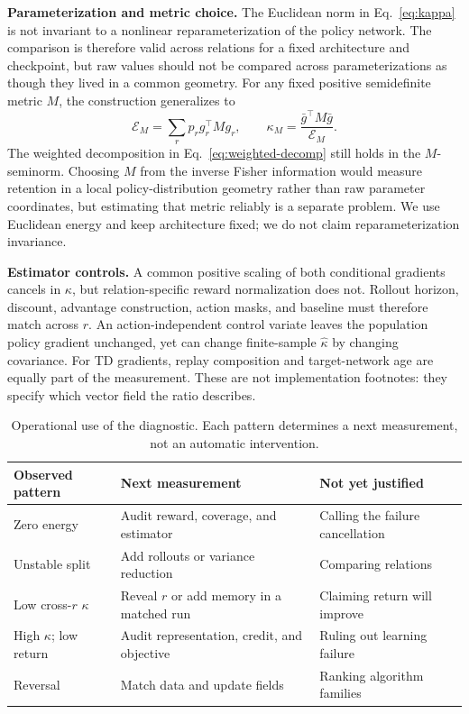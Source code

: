 \documentclass[letterpaper]{article}
\begin{document}
\textbf{Parameterization and metric choice.}
The Euclidean norm in Eq.~\eqref{eq:kappa} is not invariant to a nonlinear reparameterization of the policy network.
The comparison is therefore valid across relations for a fixed architecture and checkpoint, but raw values should not be compared across parameterizations as though they lived in a common geometry.
For any fixed positive semidefinite metric $M$, the construction generalizes to
\begin{equation}
\mathcal{E}_M=\sum_r p_r g_r^\top M g_r,
\qquad
\kappa_M=\frac{\bar g^\top M\bar g}{\mathcal{E}_M}.
\label{eq:metric}
\end{equation}
The weighted decomposition in Eq.~\eqref{eq:weighted-decomp} still holds in the $M$-seminorm.
Choosing $M$ from the inverse Fisher information would measure retention in a local policy-distribution geometry rather than raw parameter coordinates, but estimating that metric reliably is a separate problem.
We use Euclidean energy and keep architecture fixed; we do not claim reparameterization invariance.

\textbf{Estimator controls.}
A common positive scaling of both conditional gradients cancels in $\kappa$, but relation-specific reward normalization does not.
Rollout horizon, discount, advantage construction, action masks, and baseline must therefore match across $r$.
An action-independent control variate leaves the population policy gradient unchanged, yet can change finite-sample $\widehat\kappa$ by changing covariance.
For TD gradients, replay composition and target-network age are equally part of the measurement.
These are not implementation footnotes: they specify which vector field the ratio describes.

\begin{table}[t]
\centering
\small
\setlength{\tabcolsep}{2.5pt}
\begin{tabular}{
>{\raggedright\arraybackslash}p{}
>{\raggedright\arraybackslash}p{}
>{\raggedright\arraybackslash}p{}}
\toprule
Observed pattern & Next measurement & Not yet justified \\
\midrule
Zero energy &
Audit reward, coverage, and estimator &
Calling the failure cancellation \\
Unstable split &
Add rollouts or variance reduction &
Comparing relations \\
Low cross-$r$ $\kappa$ &
Reveal $r$ or add memory in a matched run &
Claiming return will improve \\
High $\kappa$; low return &
Audit representation, credit, and objective &
Ruling out learning failure \\
Reversal &
Match data and update fields &
Ranking algorithm families \\
\bottomrule
\end{tabular}
\caption{Operational use of the diagnostic.
Each pattern determines a next measurement, not an automatic intervention.}
\label{tab:actions}
\end{table}
\end{document}
